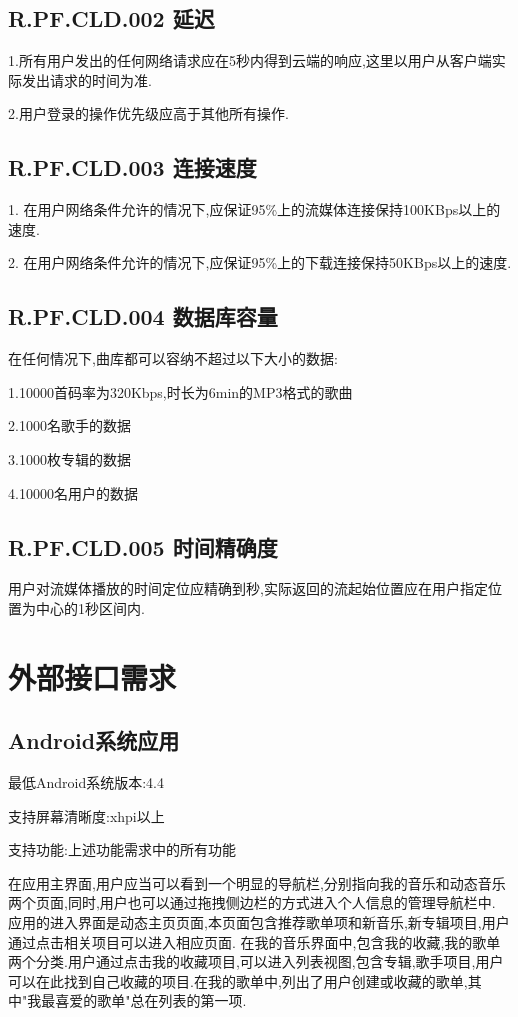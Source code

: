 \subsection{R.PF.CLD.002 延迟}

1.所有用户发出的任何网络请求应在5秒内得到云端的响应,这里以用户从客户端实际发出请求的时间为准.

2.用户登录的操作优先级应高于其他所有操作.


\subsection{R.PF.CLD.003 连接速度}

1. 在用户网络条件允许的情况下,应保证95\%上的流媒体连接保持100KBps以上的速度.

2. 在用户网络条件允许的情况下,应保证95\%上的下载连接保持50KBps以上的速度.

\subsection{R.PF.CLD.004 数据库容量}

在任何情况下,曲库都可以容纳不超过以下大小的数据:

1.10000首码率为320Kbps,时长为6min的MP3格式的歌曲

2.1000名歌手的数据

3.1000枚专辑的数据

4.10000名用户的数据


\subsection{R.PF.CLD.005 时间精确度}

用户对流媒体播放的时间定位应精确到秒,实际返回的流起始位置应在用户指定位置为中心的1秒区间内. 
 
\section{外部接口需求}

\subsection{Android系统应用}

最低Android系统版本:4.4

支持屏幕清晰度:xhpi以上

支持功能:上述功能需求中的所有功能

在应用主界面,用户应当可以看到一个明显的导航栏,分别指向我的音乐和动态音乐两个页面,同时,用户也可以通过拖拽侧边栏的方式进入个人信息的管理导航栏中.
应用的进入界面是动态主页页面,本页面包含推荐歌单项和新音乐,新专辑项目,用户通过点击相关项目可以进入相应页面.
在我的音乐界面中,包含我的收藏,我的歌单两个分类.用户通过点击我的收藏项目,可以进入列表视图,包含专辑,歌手项目,用户可以在此找到自己收藏的项目.在我的歌单中,列出了用户创建或收藏的歌单,其中"我最喜爱的歌单"总在列表的第一项.

